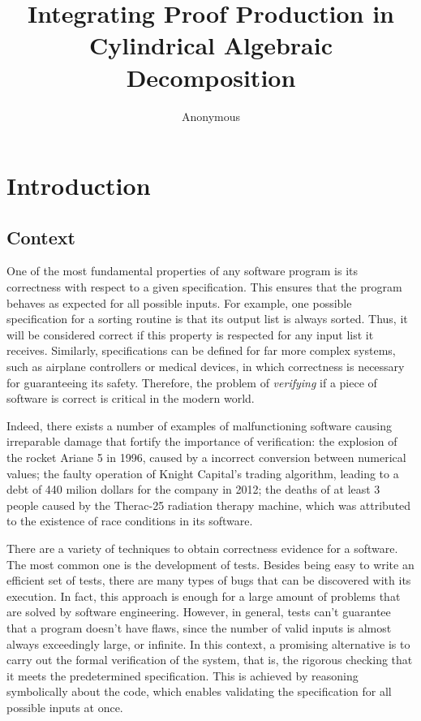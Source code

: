 \documentclass[a4paper, 12pt]{article}
\title{Integrating Proof Production in Cylindrical Algebraic Decomposition}
\author{Anonymous}
\date{}
\begin{document}
\maketitle

\vspace{-20pt}
\section{Introduction}
\subsection{Context}


\qquad One of the most fundamental properties of any software program is its correctness with respect
to a given specification. This ensures that the program behaves as expected for all possible inputs.
For example, one possible specification for a sorting routine is that its output list is always sorted.
Thus, it will be considered correct if this property is respected for any input list it receives.
Similarly, specifications can be defined for far more complex systems, such as airplane
controllers or medical devices, in which correctness is necessary for guaranteeing its safety.
Therefore, the problem of \textit{verifying} if a piece of software is correct is critical in the modern world.

Indeed, there exists a number of examples of malfunctioning software causing irreparable damage
that fortify the importance of verification: the explosion of the rocket Ariane 5 in 1996, caused by
a incorrect conversion between numerical values; the faulty operation of Knight Capital's trading algorithm,
leading to a debt of 440 milion dollars for the company in 2012; the deaths of at least 3 people caused by
the Therac-25 radiation therapy machine, which was attributed to the existence of race conditions in its
software.


There are a variety of techniques to obtain correctness evidence for a
software. The most common one is the development of tests. Besides being easy to write
an efficient set of tests, there are many types of bugs that can be
discovered with its execution. In fact, this approach is enough for a large
amount of problems that are solved by software engineering.
However, in general, tests can't guarantee that a program doesn't have flaws, since the number of
valid inputs is almost always exceedingly large, or infinite.
In this context, a promising alternative is to carry out the formal verification
of the system, that is, the rigorous checking that it meets the predetermined specification.
This is achieved by reasoning symbolically about the code, which enables validating the specification
for all possible inputs at once.
\end{document}
